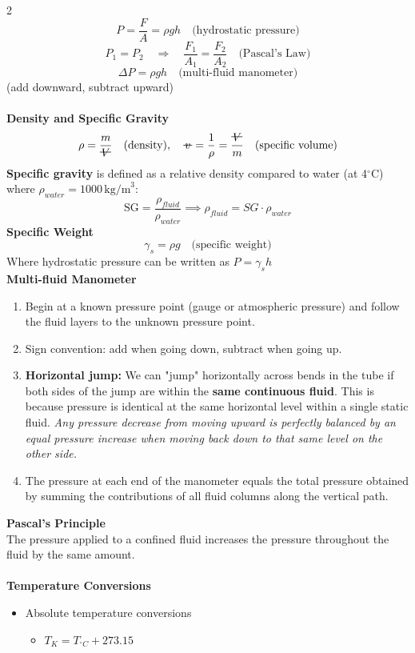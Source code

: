 \documentclass[10pt, fleqn]{article}
\newcommand{\vol}{\mathord{\text{\ooalign{\hidewidth $V$\hidewidth\cr\kern-0.5pt\raisebox{0.8ex}{\rule[0pt]{1em}{0.5pt}}}}}}
\newcommand{\svol}{%
  \mathord{\text{\ooalign{%
    \hfil$v$\hfil\cr
    \hfil\rule[0.6ex]{0.8em}{0.5pt}\hfil
  }}}%
}
\begin{document}
\begin{multicols}{2}
\[P = \frac{F}{A} = \rho g h \quad \text{(hydrostatic pressure)}\]
\[P_1 = P_2 \quad \Rightarrow \quad \frac{F_1}{A_1} = \frac{F_2}{A_2} \quad \text{(Pascal's Law)}\]
\[\Delta P = \rho g h \quad \text{(multi-fluid manometer)}\]
(add downward, subtract upward)\\\\
\textbf{Density and Specific Gravity}
\[\rho = \frac{m}{\vol}\quad \text{(density)}, \quad \svol = \frac{1}{\rho} = \frac{\vol}{m}  \quad \text{(specific volume)}\]
\textbf{Specific gravity} is defined as a relative density compared to water (at 4$^\circ$C) where $\rho_{water} = 1000\,\text{kg/m}^3$:
\[\text{SG} = \frac{\rho_{fluid}}{\rho_{water}} \implies \rho_{fluid} = SG \cdot \rho_{water}\]
\textbf{Specific Weight}
\[\gamma_s = \rho g \quad \text{(specific weight)}\]
Where hydrostatic pressure can be written as $P = \gamma_s h$
\newcolumn\\
\textbf{Multi-fluid Manometer}
\begin{enumerate}
    \item Begin at a known pressure point (gauge or atmospheric pressure) and follow the fluid layers to the unknown pressure point.
    \item Sign convention: add when going down, subtract when going up.
    \item \textbf{Horizontal jump:} We can "jump" horizontally across bends in the tube if both sides of the jump are within the \textbf{same continuous fluid}. This is because pressure is identical at the same horizontal level within a single static fluid. \textit{Any pressure decrease from moving upward is perfectly balanced by an equal pressure increase when moving back down to that same level on the other side.}
    \item The pressure at each end of the manometer equals the total pressure obtained by summing the contributions of all fluid columns along the vertical path.
\end{enumerate}
\textbf{Pascal's Principle}\\
The pressure applied to a confined fluid increases the pressure throughout the fluid by the same amount.\\\\
\textbf{Temperature Conversions}
\begin{itemize}[label=\textbullet]
    \item Absolute temperature conversions
    \begin{itemize}[label=\textopenbullet]
        \item $T_{K} = T_{^\circ C} + 273.15$

\end{itemize}
\end{itemize}
\end{multicols}
\end{document}
